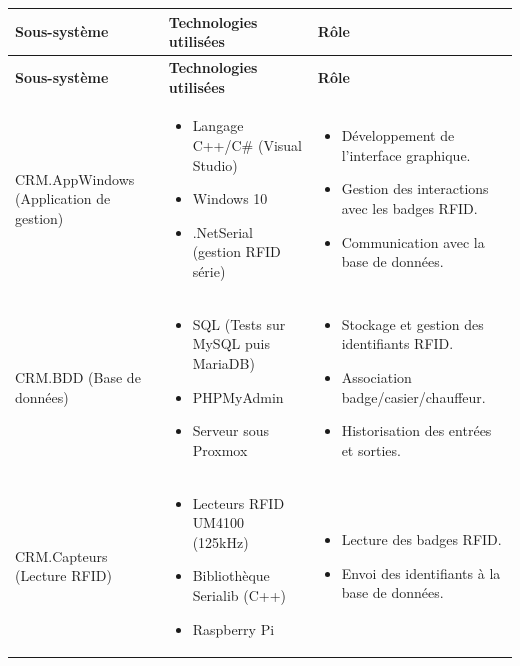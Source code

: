 \documentclass[main.tex]{subfiles}
\begin{document}
\begin{longtable}{|p{4.5cm}|p{5.5cm}|p{6cm}|}
\hline
\textbf{Sous-système} & \textbf{Technologies utilisées} & \textbf{Rôle} \\
\hline
\endfirsthead
\hline
\textbf{Sous-système} & \textbf{Technologies utilisées} & \textbf{Rôle} \\
\hline
\endhead

CRM.AppWindows (Application de gestion) & 
\begin{itemize}
  \item Langage C++/C\# (Visual Studio)
  \item Windows 10
  \item .NetSerial (gestion RFID série)
\end{itemize} &
\begin{itemize}
  \item Développement de l’interface graphique.
  \item Gestion des interactions avec les badges RFID.
  \item Communication avec la base de données.
\end{itemize} \\
\hline

CRM.BDD (Base de données) & 
\begin{itemize}
  \item SQL (Tests sur MySQL puis MariaDB)
  \item PHPMyAdmin
  \item Serveur sous Proxmox
\end{itemize} &
\begin{itemize}
  \item Stockage et gestion des identifiants RFID.
  \item Association badge/casier/chauffeur.
  \item Historisation des entrées et sorties.
\end{itemize} \\
\hline

CRM.Capteurs (Lecture RFID) & 
\begin{itemize}
  \item Lecteurs RFID UM4100 (125kHz)
  \item Bibliothèque Serialib (C++)
  \item Raspberry Pi
\end{itemize} &
\begin{itemize}
  \item Lecture des badges RFID.
  \item Envoi des identifiants à la base de données.
\end{itemize} \\
\hline


\end{longtable}
\end{document}
